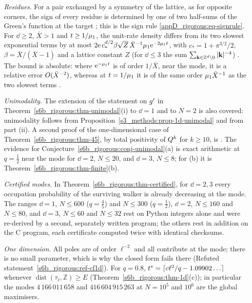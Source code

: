 \emph{Residues.} For a pair exchanged by a symmetry of the lattice, as for opposite corners, the sign of every residue
is determined by one of two half-sums of the Green's function at the target ; this is the sign rule
\eqref{appD_rigorous:eq-signrule}. For $\dd\ge2$, $\bar X>1$ and $t\ge1/\mu_{1}$, the unit-rate density differs from its two
slowest exponential terms by at most $2\mathrm{e}\,c_*^{d/2}\beta\sqrt{Z}\,\bar X^{-1}\mu_{1}\mathrm{e}^{-2\mu_{1} t}$, with $c_*=1+\pi^{3/2}/2$,
$\beta=\bar X/(\bar X-1)$ and a lattice constant $Z$ (for $\dd\le3$ the sum $\sum_{\mathbf{k}\in\mathbb Z^{d}\setminus0}|\mathbf{k}|^{-4}$)
. The bound is absolute: where $\mathrm{e}^{-\mu_{1} t}$ is of order $1/\bar X$, near the mode, it is
a relative error $O(\bar X^{-2})$, whereas at $t=1/\mu_{1}$ it is of the same order $\mu_{1}\bar X^{-1}$ as the two
slowest terms .

\emph{Unimodality.} The extension of the statement on $g'$ in Theorem~\ref{s6b_rigorous:thm-unimodal}(i) to $\dd=1$ and to
$N=2$ is also covered: unimodality follows from
Proposition~\ref{s3_methods:prop-1d-unimodal} and from part (ii). A second proof of the one-dimensional case of
Theorem~\ref{s6b_rigorous:thm-45}, by total positivity of $Q^{k}$ for $k\ge10$, is . The evidence for
Conjecture~\ref{s6b_rigorous:conj-unimodal}(a) is exact arithmetic at $q=\frac12$ near the mode for $\dd=2$, $N\le20$, and
$\dd=3$, $N\le8$; for (b) it is Theorem~\ref{s6b_rigorous:thm-finite}(b).

\emph{Certified modes.} In Theorem~\ref{s6b_rigorous:thm-certified}, for $\dd=2,3$ every occupation probability of the
surviving walker is already decreasing at the mode. The ranges $\dd=1$, $N\le600$ ($q=\frac45$) and $N\le300$ ($q=\frac12$),
$\dd=2$, $N\le160$ and $N\le80$, and $\dd=3$, $N\le60$ and $N\le32$ rest on Python integers alone and were re-derived by a
second, separately written program; the others rest in addition on the C program, each certificate computed twice with
identical checksums.

\emph{One dimension.} All poles are of order $\ell^{-2}$ and all contribute at the mode; there is no small parameter, which
is why the closed form fails there (Refuted statement~\ref{s6b_rigorous:ref-cf1d}). For $q=0.8$,
$t^{*}=\lceil c\ell^{2}/q-1.09902\ldots\rceil$ whenever $\operatorname{dist}(\tau_\ell,\mathbb Z)\ge E$
(Theorem~\ref{s6b_rigorous:thm-1d}(c)); in particular the modes $4\,166\,011\,658$ and $416\,604\,915\,263$ at $N=10^{5}$ and
$10^{6}$ are the global maximisers.

